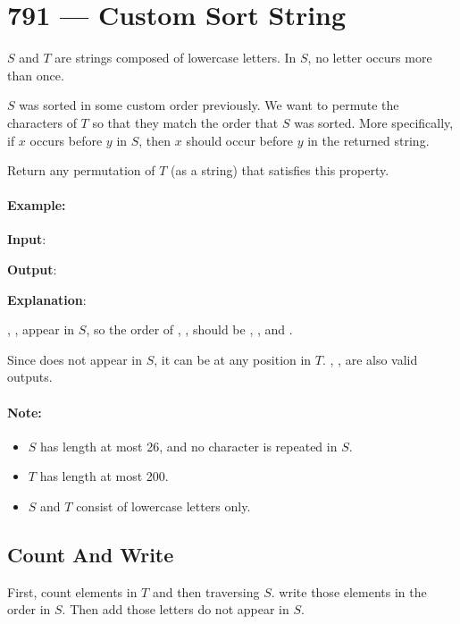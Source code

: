 \section{791 --- Custom Sort String}
$S$ and $T$ are strings composed of lowercase letters. In $S$, no letter occurs more than once.

$S$ was sorted in some custom order previously. We want to permute the characters of $T$ so that they match the order that $S$ was sorted. More specifically, if $x$ occurs before $y$ in $S$, then $x$ should occur before $y$ in the returned string.

Return any permutation of $T$ (as a string) that satisfies this property.

\paragraph{Example:}
\begin{flushleft}


\textbf{Input}: 



\textbf{Output}: 

\textbf{Explanation}: 

, ,  appear in $S$, so the order of , ,  should be , , and .
 
Since  does not appear in $S$, it can be at any position in $T$. , ,  are also valid outputs.
 
\end{flushleft}

\paragraph{Note:}

\begin{itemize}
\item $S$ has length at most 26, and no character is repeated in $S$.
\item $T$ has length at most 200.
\item $S$ and $T$ consist of lowercase letters only.
\end{itemize}

\subsection{Count And Write}
First, count elements in $T$ and then traversing $S$. write those elements in the order in $S$. Then add those letters do not appear in $S$.

